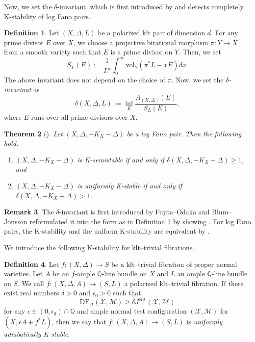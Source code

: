 \documentclass[12pt,twoside]{amsart}
\newtheorem{thm}{Theorem}[section]
\theoremstyle{definition}
\newtheorem{defn}[thm]{Definition}
\newtheorem{rem}[thm]{Remark}
\begin{document}
Now, we set the $\delta$-invariant, which is first introduced by \cite{FO} and detects completely K-stability of log Fano pairs. 
\begin{defn}\label{defn--delta}
    Let $(X,\Delta,L)$ be  a polarized klt pair of dimension $d$.
    For any prime divisor $E$ over $X$, we choose a projective birational morphism $\pi\colon Y\to X$ from a smooth variety such that $E$ is a prime divisor on $Y$.
    Then, we set
    \[
    S_L(E):=\frac{1}{L^d}\int^{\infty}_0\mathrm{vol}_Y(\pi^*L-xE)dx.
    \]
    The above invariant does not depend on the choice of $\pi$.
    Now, we set the {\it $\delta$-invariant} as
    \[
    \delta(X,\Delta,L):=\inf_{E}\frac{A_{(X,\Delta)}(E)}{S_L(E)},
    \]
    where $E$ runs over all prime divisors over $X$.
\end{defn}

\begin{thm}[{\cite[Theorem B]{BlJ}}]
Let $(X,\Delta,-K_X-\Delta)$ be a log Fano pair.
Then the following hold.
\begin{enumerate}
    \item $(X,\Delta,-K_X-\Delta)$ is K-semistable if and only if $\delta(X,\Delta,-K_X-\Delta)\ge1$, and 
    \item $(X,\Delta,-K_X-\Delta)$ is uniformly K-stable if and only if $\delta(X,\Delta,-K_X-\Delta)>1$.
\end{enumerate}
\end{thm}

\begin{rem}
The $\delta$-invariant is first introduced by Fujita--Odaka \cite{FO} and Blum--Jonsson reformulated it into the form as in Definition \ref{defn--delta} by showing \cite[Theorem 4.4]{BlJ}.
    For log Fano pairs, the K-stability and the uniform K-stability are equivalent by \cite[Theorem 1.6]{LXZ}.
\end{rem}

We introduce the following K-stability for klt--trivial fibrations.

\begin{defn}\label{defn--unif--ad--Kst}
    Let $f\colon (X,\Delta)\to S$ be a klt--trivial fibration of proper normal varieties.
    Let $A$ be an $f$-ample $\mathbb{Q}$-line bundle on $X$ and $L$ an ample $\mathbb{Q}$-line bundle on $S$.
    We call $f\colon (X,\Delta,A)\to (S,L)$ a polarized klt--trivial fibration.
    If there exist real numbers $\delta>0$ and $\epsilon_0>0$ such that  
    \[
    \mathrm{DF}_{\Delta}(\mathcal{X},\mathcal{M})\ge\delta J^{\mathrm{NA}}(\mathcal{X},\mathcal{M})
    \]
    for any $\epsilon\in(0,\epsilon_0)\cap\mathbb{Q}$ and ample normal test configuration $(\mathcal{X},\mathcal{M})$ for $(X,\epsilon A+f^*L)$, then we say that $f\colon (X,\Delta,A)\to (S,L)$ is {\em uniformly adiabatically K-stable}.
\end{defn}
\end{document}
